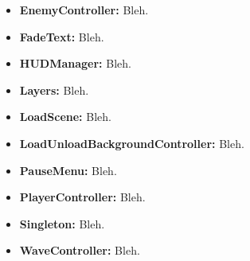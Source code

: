 \documentclass[titlepage, 4apaper]{article}
\begin{document}
\begin{itemize}
  \item \textbf{EnemyController:} Bleh.
  \item \textbf{FadeText:} Bleh.
  \item \textbf{HUDManager:} Bleh.
  \item \textbf{Layers:} Bleh.
  \item \textbf{LoadScene:} Bleh.
  \item \textbf{LoadUnloadBackgroundController:} Bleh.
  \item \textbf{PauseMenu:} Bleh.
  \item \textbf{PlayerController:} Bleh.
  \item \textbf{Singleton:} Bleh.
  \item \textbf{WaveController:} Bleh.

\end{itemize}
\end{document}
